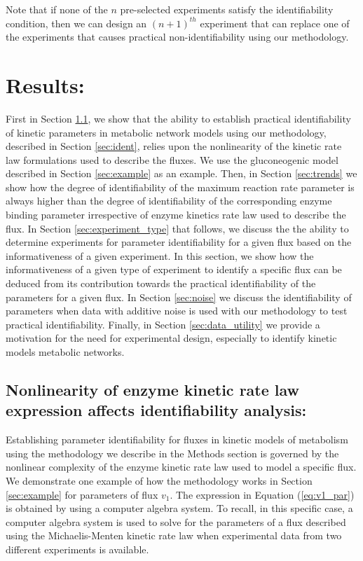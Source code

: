 \documentclass[10pt]{article}
\begin{document}
Note that if none of the $n$ pre-selected experiments satisfy the identifiability condition, then we can design an $(n+1)^{th}$ experiment that can replace one of the experiments that causes practical non-identifiability using our methodology. 

\section{Results:}
First in Section \ref{sec:closedform}, we show that the ability to establish practical identifiability of kinetic parameters in metabolic network models using our methodology, described in Section \ref{sec:ident}, relies upon the nonlinearity of the kinetic rate law formulations used to describe the fluxes. We use the gluconeogenic model described in Section \ref{sec:example} as an example. Then, in Section \ref{sec:trends} we show how the degree of identifiability of the maximum reaction rate parameter is always higher than the degree of identifiability of the corresponding enzyme binding parameter irrespective of enzyme kinetics rate law used to describe the flux. In Section \ref{sec:experiment_type} that follows, we discuss the the ability to determine experiments for parameter identifiability for a given flux based on the informativeness of a given experiment. In this section, we show how the informativeness of a given type of experiment to identify a specific flux can be deduced from its contribution towards the practical identifiability of the parameters for a given flux. In Section \ref{sec:noise} we discuss the identifiability of parameters when data with additive noise is used with our methodology to test practical identifiability. Finally, in Section \ref{sec:data_utility} we provide a motivation for the need for experimental design, especially to identify kinetic models metabolic networks.

\subsection{Nonlinearity of enzyme kinetic rate law expression affects identifiability analysis:}\label{sec:closedform}
Establishing parameter identifiability for fluxes in kinetic models of metabolism using the methodology we describe in the Methods section is governed by the nonlinear complexity of the enzyme kinetic rate law used to model a specific flux. We demonstrate one example of how the methodology works in Section \ref{sec:example} for parameters of flux $v_1$. The expression in Equation (\ref{eq:v1_par}) is obtained by using a computer algebra system. To recall, in this specific case, a computer algebra system is used to solve for the parameters of a flux described using the Michaelis-Menten kinetic rate law when experimental data from two different experiments is available. 
\end{document}
